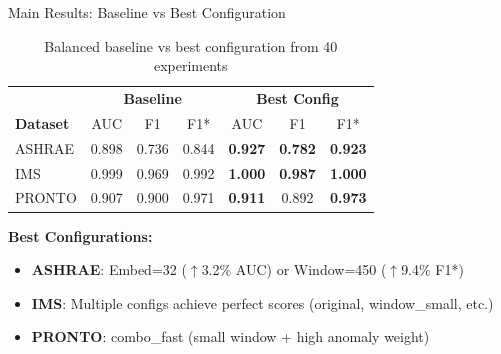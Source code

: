 \documentclass[aspectratio=169,11pt]{beamer}
\begin{document}
\begin{frame}{Main Results: Baseline vs Best Configuration}
    \begin{table}[h]
        \centering
        \small
        \begin{tabular}{l|ccc|ccc}
            \toprule
            & \multicolumn{3}{c|}{\textbf{Baseline}} & \multicolumn{3}{c}{\textbf{Best Config}} \\
            \textbf{Dataset} & AUC & F1 & F1* & AUC & F1 & F1* \\
            \midrule
            ASHRAE & 0.898 & 0.736 & 0.844 & \textbf{0.927} & \textbf{0.782} & \textbf{0.923} \\
            IMS & 0.999 & 0.969 & 0.992 & \textbf{1.000} & \textbf{0.987} & \textbf{1.000} \\
            PRONTO & 0.907 & 0.900 & 0.971 & \textbf{0.911} & 0.892 & \textbf{0.973} \\
            \bottomrule
        \end{tabular}
        \caption{Balanced baseline vs best configuration from 40 experiments}
    \end{table}

    \vspace{0.3cm}
    \textbf{Best Configurations:}
    \begin{itemize}
        \item \textbf{ASHRAE}: Embed=32 ($\uparrow$3.2\% AUC) or Window=450 ($\uparrow$9.4\% F1*)
        \item \textbf{IMS}: Multiple configs achieve perfect scores (original, window\_small, etc.)
        \item \textbf{PRONTO}: combo\_fast (small window + high anomaly weight)
    \end{itemize}
\end{frame}
\end{document}
